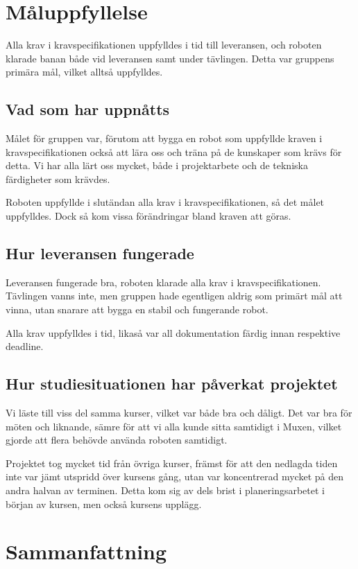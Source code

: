 \documentclass[a4paper,12pt]{article}
\begin{document}
\section{Måluppfyllelse}
Alla krav i kravspecifikationen uppfylldes i tid till leveransen, och roboten klarade banan både vid leveransen samt
under tävlingen. Detta var gruppens primära mål, vilket alltså uppfylldes. 

\subsection{Vad som har uppnåtts}
Målet för gruppen var, förutom att bygga en robot som uppfyllde kraven i kravspecifikationen också att lära oss 
och träna på de kunskaper som krävs för detta. Vi har alla lärt oss mycket, både i projektarbete och de tekniska 
färdigheter som krävdes. 

Roboten uppfyllde i slutändan alla krav i kravspecifikationen, så det målet uppfylldes. Dock så kom vissa förändringar
bland kraven att göras. 

\subsection{Hur leveransen fungerade}
Leveransen fungerade bra, roboten klarade alla krav i kravspecifikationen. Tävlingen vanns inte, men gruppen hade 
egentligen aldrig som primärt mål att vinna, utan snarare att bygga en stabil och fungerande robot.

Alla krav uppfylldes i tid, likaså var all dokumentation färdig innan respektive deadline. 

\subsection{Hur studiesituationen har påverkat projektet}
Vi läste till viss del samma kurser, vilket var både bra och dåligt. Det var bra för möten och liknande, sämre för att vi alla 
kunde sitta samtidigt i Muxen, vilket gjorde att flera behövde använda roboten samtidigt. 

Projektet tog mycket tid från övriga kurser, främst för att den nedlagda tiden inte var jämt utspridd över kursens gång, 
utan var koncentrerad mycket på den andra halvan av terminen. Detta kom sig av dels brist i planeringsarbetet i början
av kursen, men också kursens upplägg. 


\section{Sammanfattning}
\end{document}
